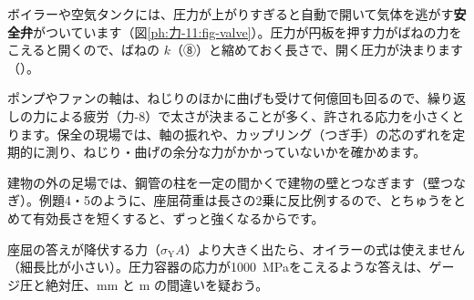 \begin{phkougaku}[安全弁・軸・足場]
ボイラーや空気タンクには、圧力が上がりすぎると自動で開いて気体を逃がす\textbf{安全弁}がついています（図\ref{ph:力-11:fig-valve}）。圧力が円板を押す力がばねの力をこえると開くので、ばねの $k$（⑧）と縮めておく長さで、開く圧力が決まります（）。

ポンプやファンの軸は、ねじりのほかに曲げも受けて何億回も回るので、繰り返しの力による疲労（力-8）で太さが決まることが多く、許される応力を小さくとります。保全の現場では、軸の振れや、カップリング（つぎ手）の芯のずれを定期的に測り、ねじり・曲げの余分な力がかかっていないかを確かめます。

建物の外の足場では、鋼管の柱を一定の間かくで建物の壁とつなぎます（壁つなぎ）。例題4・5のように、座屈荷重は長さの2乗に反比例するので、とちゅうをとめて有効長さを短くすると、ずっと強くなるからです。

\begin{phketa}
座屈の答えが降伏する力（$\sigma_{\mathrm Y}A$）より大きく出たら、オイラーの式は使えません（細長比が小さい）。圧力容器の応力が\qty{1000}{MPa}をこえるような答えは、ゲージ圧と絶対圧、mm と m の間違いを疑おう。
\end{phketa}
\end{phkougaku}


